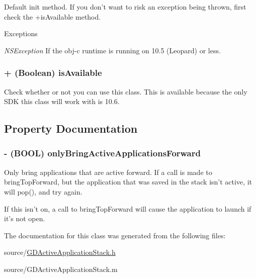 Default init method. If you don't want to risk an exception being thrown, first check the +isAvailable method.


\begin{DoxyExceptions}{Exceptions}
\item[{\em NSException}]If the obj-\/c runtime is running on 10.5 (Leopard) or less. \end{DoxyExceptions}
\hypertarget{interface_g_d_active_application_stack_a10055d2ffec472e9413a8d84a7d8dd67}{
\subsubsection[{isAvailable}]{\setlength{\rightskip}{0pt plus 5cm}+ (Boolean) isAvailable }}
\label{interface_g_d_active_application_stack_a10055d2ffec472e9413a8d84a7d8dd67}


Check whether or not you can use this class. This is available because the only SDK this class will work with is 10.6. 

\subsection{Property Documentation}
\hypertarget{interface_g_d_active_application_stack_a5714844d3e17a156cca14b1f383b3dbe}{
\subsubsection[{onlyBringActiveApplicationsForward}]{\setlength{\rightskip}{0pt plus 5cm}-\/ (BOOL) onlyBringActiveApplicationsForward}}
\label{interface_g_d_active_application_stack_a5714844d3e17a156cca14b1f383b3dbe}


Only bring applications that are active forward. If a call is made to bringTopForward, but the application that was saved in the stack isn't active, it will pop(), and try again.

If this isn't on, a call to bringTopForward will cause the application to launch if it's not open. 

The documentation for this class was generated from the following files:\begin{DoxyCompactItemize}
\item 
source/\hyperlink{_g_d_active_application_stack_8h}{GDActiveApplicationStack.h}\item 
source/GDActiveApplicationStack.m\end{DoxyCompactItemize}
